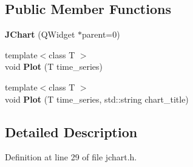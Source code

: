 \subsection*{Public Member Functions}
\begin{DoxyCompactItemize}
\item 
{\bfseries J\+Chart} (Q\+Widget $\ast$parent=0)\hypertarget{class_j_chart_a81eedfa59e116cd9b22c10dcb94faa75}{}\label{class_j_chart_a81eedfa59e116cd9b22c10dcb94faa75}

\item 
{\footnotesize template$<$class T $>$ }\\void {\bfseries Plot} (T time\+\_\+series)\hypertarget{class_j_chart_a174b9eaf4c484e352db3ebf7d201e5a3}{}\label{class_j_chart_a174b9eaf4c484e352db3ebf7d201e5a3}

\item 
{\footnotesize template$<$class T $>$ }\\void {\bfseries Plot} (T time\+\_\+series, std\+::string chart\+\_\+title)\hypertarget{class_j_chart_a587dd3656171d836b32c4d3578066e4f}{}\label{class_j_chart_a587dd3656171d836b32c4d3578066e4f}

\end{DoxyCompactItemize}


\subsection{Detailed Description}


Definition at line 29 of file jchart.\+h.

